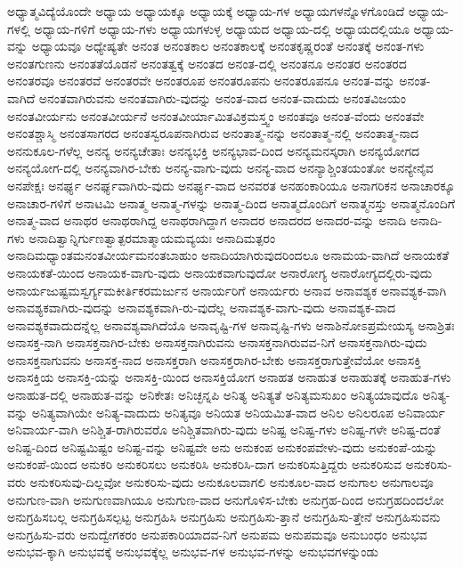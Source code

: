 {ಅಧ್ಯಾತ್ಮವಿದ್ಯೆಯೊಂದೇ
ಅಧ್ಯಾಯ
ಅಧ್ಯಾಯಕ್ಕೂ
ಅಧ್ಯಾಯಕ್ಕೆ
ಅಧ್ಯಾಯ-ಗಳ
ಅಧ್ಯಾಯಗಳನ್ನೊಳಗೊಂಡಿದೆ
ಅಧ್ಯಾಯ-ಗಳಲ್ಲಿ
ಅಧ್ಯಾಯ-ಗಳಿಗೆ
ಅಧ್ಯಾಯ-ಗಳು
ಅಧ್ಯಾಯಗಳುಳ್ಳ
ಅಧ್ಯಾಯದ
ಅಧ್ಯಾಯ-ದಲ್ಲಿ
ಅಧ್ಯಾಯದಲ್ಲಿಯೂ
ಅಧ್ಯಾಯ-ವನ್ನು
ಅಧ್ಯಾಯವೂ
ಅಧ್ಯೇಷ್ಯತೇ
ಅನಂತ
ಅನಂತಕಾಲ
ಅನಂತಕಾಲಕ್ಕೆ
ಅನಂತಕೃಷ್ಣರಂತೆ
ಅನಂತಕ್ಕೆ
ಅನಂತ-ಗಳು
ಅನಂತಗುಣನು
ಅನಂತತೆಯೊಡನೆ
ಅನಂತತ್ವಕ್ಕೆ
ಅನಂತದ
ಅನಂತ-ದಲ್ಲಿ
ಅನಂತನೂ
ಅನಂತರ
ಅನಂತರದ
ಅನಂತರವೂ
ಅನಂತರವೆ
ಅನಂತರವೇ
ಅನಂತರೂಪ
ಅನಂತರೂಪನು
ಅನಂತರೂಪನೂ
ಅನಂತ-ವನ್ನು
ಅನಂತ-ವಾಗಿದೆ
ಅನಂತವಾಗಿರುವನು
ಅನಂತವಾಗಿರು-ವುದನ್ನು
ಅನಂತ-ವಾದ
ಅನಂತ-ವಾದುದು
ಅನಂತವಿಜಯಂ
ಅನಂತವೀರ್ಯನು
ಅನಂತವೀರ್ಯನೆ
ಅನಂತವೀರ್ಯಾಮಿತವಿಕ್ರಮಸ್ತ್ವಂ
ಅನಂತವೂ
ಅನಂತ-ವೆಂದು
ಅನಂತವೇ
ಅನಂತಶ್ಚಾಸ್ಮಿ
ಅನಂತಸಾಗರದ
ಅನಂತಸ್ವರೂಪನಾಗಿರುವ
ಅನಂತಾತ್ಮ-ನನ್ನು
ಅನಂತಾತ್ಮ-ನಲ್ಲಿ
ಅನಂತಾತ್ಮ-ನಾದ
ಅನನುಕೂಲ-ಗಳೆಲ್ಲ
ಅನನ್ಯ
ಅನನ್ಯಚೇತಾಃ
ಅನನ್ಯಭಕ್ತಿ
ಅನನ್ಯಭಾವ-ದಿಂದ
ಅನನ್ಯಮನಸ್ಕರಾಗಿ
ಅನನ್ಯಯೋಗದ
ಅನನ್ಯಯೋಗ-ದಲ್ಲಿ
ಅನನ್ಯವಾಗಿರ-ಬೇಕು
ಅನನ್ಯ-ವಾಗು-ವುದು
ಅನನ್ಯ-ವಾದ
ಅನನ್ಯಾಶ್ಚಿಂತಯಂತೋ
ಅನನ್ಯೇನೈವ
ಅನಪೇಕ್ಷಃ
ಅನರ್ಘ್ಯ
ಅನರ್ಘ್ಯವಾಗಿರು-ವುದು
ಅನರ್ಘ್ಯ-ವಾದ
ಅನವರತ
ಅನಹಂಕಾರಿಯೂ
ಅನಾಗರಿಕನ
ಅನಾಚಾರಕ್ಕೂ
ಅನಾಚಾರ-ಗಳಿಗೆ
ಅನಾಟಮಿ
ಅನಾತ್ಮ
ಅನಾತ್ಮ-ಗಳನ್ನು
ಅನಾತ್ಮ-ದಿಂದ
ಅನಾತ್ಮದೊಂದಿಗೆ
ಅನಾತ್ಮನಸ್ತು
ಅನಾತ್ಮನೊಂದಿಗೆ
ಅನಾತ್ಮ-ವಾದ
ಅನಾಥರ
ಅನಾಥರಾಗಿದ್ದ
ಅನಾಥರಾಗಿದ್ದಾಗ
ಅನಾದರ
ಅನಾದರದ
ಅನಾದರ-ವನ್ನು
ಅನಾದಿ
ಅನಾದಿ-ಗಳು
ಅನಾದಿತ್ವಾನ್ನಿರ್ಗುಣತ್ವಾತ್ಪರಮಾತ್ಮಾಯಮವ್ಯಯಃ
ಅನಾದಿಮತ್ಪರಂ
ಅನಾದಿಮಧ್ಯಾಂತಮನಂತವೀರ್ಯಮನಂತಬಾಹುಂ
ಅನಾದಿಯಾಗಿರುವುದರಿಂದಲೂ
ಅನಾಮಯ-ವಾಗಿದೆ
ಅನಾಯಕತೆ
ಅನಾಯಕತೆ-ಯಿಂದ
ಅನಾಯಕ-ವಾಗು-ವುದು
ಅನಾಯಕವಾಗುವುದೋ
ಅನಾರೋಗ್ಯ
ಅನಾರೋಗ್ಯದಲ್ಲಿರು-ವುದು
ಅನಾರ್ಯಜುಷ್ಟಮಸ್ವರ್ಗ್ಯಮಕೀರ್ತಿಕರಮರ್ಜುನ
ಅನಾರ್ಯರಿಗೆ
ಅನಾರ್ಯರು
ಅನಾವ
ಅನಾವಶ್ಯಕ
ಅನಾವಶ್ಯಕ-ವಾಗಿ
ಅನಾವಶ್ಯಕವಾಗಿರು-ವುದನ್ನು
ಅನಾವಶ್ಯಕವಾಗಿ-ರು-ವುದೆಲ್ಲ
ಅನಾವಶ್ಯಕ-ವಾಗು-ವುದು
ಅನಾವಶ್ಯಕ-ವಾದ
ಅನಾವಶ್ಯಕವಾದುದನ್ನೆಲ್ಲ
ಅನಾವಶ್ಯವಾಗಿದೆಯೊ
ಅನಾವೃಷ್ಟಿ-ಗಳ
ಅನಾವೃಷ್ಟಿ-ಗಳು
ಅನಾಶಿನೋಽಪ್ರಮೇಯಸ್ಯ
ಅನಾಶ್ರಿತಃ
ಅನಾಸಕ್ತ-ನಾಗಿ
ಅನಾಸಕ್ತನಾಗಿರ-ಬೇಕು
ಅನಾಸಕ್ತನಾಗಿರುವನು
ಅನಾಸಕ್ತನಾಗಿರುವವ-ನಿಗೆ
ಅನಾಸಕ್ತನಾಗಿರು-ವುದು
ಅನಾಸಕ್ತನಾಗುವನು
ಅನಾಸಕ್ತ-ನಾದ
ಅನಾಸಕ್ತರಾಗಿ
ಅನಾಸಕ್ತರಾಗಿರ-ಬೇಕು
ಅನಾಸಕ್ತರಾಗುತ್ತೇವೆಯೋ
ಅನಾಸಕ್ತಿ
ಅನಾಸಕ್ತಿಯ
ಅನಾಸಕ್ತಿ-ಯನ್ನು
ಅನಾಸಕ್ತಿ-ಯಿಂದ
ಅನಾಸಕ್ತಿಯೋಗ
ಅನಾಹತ
ಅನಾಹುತ
ಅನಾಹುತಕ್ಕೆ
ಅನಾಹುತ-ಗಳು
ಅನಾಹುತ-ದಲ್ಲಿ
ಅನಾಹುತ-ವನ್ನು
ಅನಿಕೇತಃ
ಅನಿಚ್ಛನ್ನಪಿ
ಅನಿತ್ಯ
ಅನಿತ್ಯತೆ
ಅನಿತ್ಯಮಸುಖಂ
ಅನಿತ್ಯಯಾವುದೊ
ಅನಿತ್ಯ-ವನ್ನು
ಅನಿತ್ಯವಾಗಿಯೇ
ಅನಿತ್ಯ-ವಾದುದು
ಅನಿತ್ಯವೂ
ಅನಿಯತ
ಅನಿಯಮಿತ-ವಾದ
ಅನಿಲ
ಅನಿಲರೂಪ
ಅನಿವಾರ್ಯ
ಅನಿವಾರ್ಯ-ವಾಗಿ
ಅನಿಶ್ಚಿತ-ರಾಗಿರುವರೊ
ಅನಿಶ್ಚಿತವಾಗಿರು-ವುದು
ಅನಿಷ್ಟ
ಅನಿಷ್ಟ-ಗಳು
ಅನಿಷ್ಟ-ಗಳೇ
ಅನಿಷ್ಟ-ದಂತೆ
ಅನಿಷ್ಟ-ದಿಂದ
ಅನಿಷ್ಟಮಿಷ್ಟಂ
ಅನಿಷ್ಟ-ವನ್ನು
ಅನಿಷ್ಟವೇ
ಅನು
ಅನುಕಂಪ
ಅನುಕಂಪವೇಳು-ವುದು
ಅನುಕಂಪೆ-ಯನ್ನು
ಅನುಕಂಪೆ-ಯಿಂದ
ಅನುಕರಿ
ಅನುಕರಿಸಲು
ಅನುಕರಿಸಿ
ಅನುಕರಿಸಿ-ದಾಗ
ಅನುಕರಿಸುತ್ತಿದ್ದರು
ಅನುಕರಿಸುವ
ಅನುಕರಿಸು-ವರು
ಅನುಕರಿಸುವು-ದಿಲ್ಲವೋ
ಅನುಕರಿಸು-ವುದು
ಅನುಕೂಲವಾಗಲಿ
ಅನುಕೂಲ-ವಾದ
ಅನುಗಾಲ
ಅನುಗಾಲವೂ
ಅನುಗುಣ-ವಾಗಿ
ಅನುಗುಣವಾಗಿಯೂ
ಅನುಗುಣ-ವಾದ
ಅನುಗೊಳಿಸ-ಬೇಕು
ಅನುಗ್ರಹ-ದಿಂದ
ಅನುಗ್ರಹದಿಂದಲೋ
ಅನುಗ್ರಹಿಸಬಲ್ಲ
ಅನುಗ್ರಹಿಸಲ್ಪಟ್ಟ
ಅನುಗ್ರಹಿಸಿ
ಅನುಗ್ರಹಿಸು
ಅನುಗ್ರಹಿಸು-ತ್ತಾನೆ
ಅನುಗ್ರಹಿಸು-ತ್ತೇನೆ
ಅನುಗ್ರಹಿಸುವನು
ಅನುಗ್ರಹಿಸು-ವರು
ಅನುದ್ವೇಗಕರಂ
ಅನುಪಕಾರಿಯಾದವ-ನಿಗೆ
ಅನುಪಮ
ಅನುಪಮವೂ
ಅನುಬಂಧಂ
ಅನುಭವ
ಅನುಭವ-ಕ್ಕಾಗಿ
ಅನುಭವಕ್ಕೆ
ಅನುಭವಕ್ಕೆಲ್ಲ
ಅನುಭವ-ಗಳ
ಅನುಭವ-ಗಳನ್ನು
ಅನುಭವಗಳನ್ನುಂಡು
}
